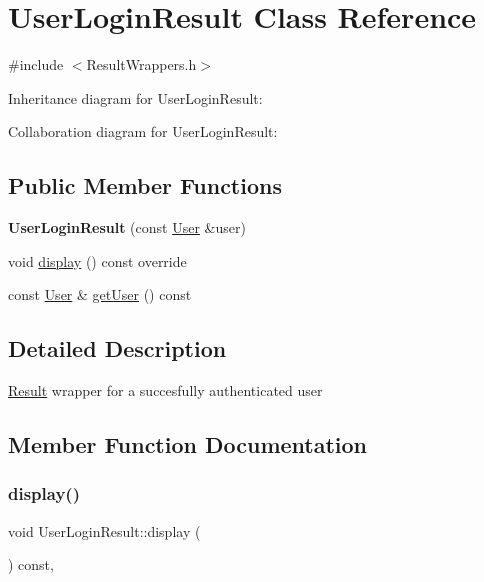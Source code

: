 \hypertarget{classUserLoginResult}{}\section{User\+Login\+Result Class Reference}
\label{classUserLoginResult}


{\ttfamily \#include $<$Result\+Wrappers.\+h$>$}



Inheritance diagram for User\+Login\+Result\+:


Collaboration diagram for User\+Login\+Result\+:
\subsection*{Public Member Functions}
\begin{DoxyCompactItemize}
\item 
\mbox{\label{classUserLoginResult_a9ae9c09b0e69250075abe54e10fc24ee}} 
{\bfseries User\+Login\+Result} (const \hyperlink{classUser}{User} \&user)
\item 
void \hyperlink{classUserLoginResult_a6257cc743f692c4914950904ebdc723d}{display} () const override
\item 
const \hyperlink{classUser}{User} \& \hyperlink{classUserLoginResult_a20c86ea6dabe661df16c24f17891e77f}{get\+User} () const
\end{DoxyCompactItemize}


\subsection{Detailed Description}
\hyperlink{classResult}{Result} wrapper for a succesfully authenticated user 

\subsection{Member Function Documentation}
\mbox{\label{classUserLoginResult_a6257cc743f692c4914950904ebdc723d}} 
\subsubsection{\texorpdfstring{display()}{display()}}
{\footnotesize\ttfamily void User\+Login\+Result\+::display (\begin{DoxyParamCaption}{ }\end{DoxyParamCaption}) const\hspace{0.3cm}{\ttfamily [override]}, {\ttfamily [virtual]}}


